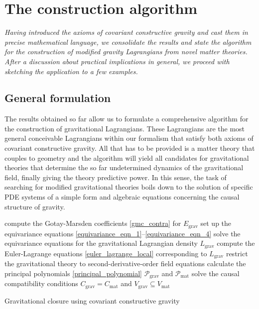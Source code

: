 \chapter{The construction algorithm}
\label{chapter_construction_algorithm}

\textit{Having introduced the axioms of covariant constructive gravity and cast them in precise mathematical language, we consolidate the results and state the algorithm for the construction of modified gravity Lagrangians from novel matter theories. After a discussion about practical implications in general, we proceed with sketching the application to a few examples.}

\section{General formulation}

The results obtained so far allow us to formulate a comprehensive algorithm for the construction of gravitational Lagrangians. These Lagrangians are the most general conceivable Lagrangians within our formalism that satisfy both axioms of covariant constructive gravity. All that has to be provided is a matter theory that couples to geometry and the algorithm will yield all candidates for gravitational theories that determine the so far undetermined dynamics of the gravitational field, finally giving the theory predictive power. In this sense, the task of searching for modified gravitational theories boils down to the solution of specific PDE systems of a simple form and algebraic equations concerning the causal structure of gravity.

\begin{algorithm}[H]\label{algorithm}
  \DontPrintSemicolon
  compute the Gotay-Marsden coefficients \eqref{gmc_contra} for $E_\text{grav}$ \;
  set up the equivariance equations \eqref{equivariance_eqn_1}--\eqref{equivariance_eqn_4} \;
  solve the equivariance equations for the gravitational Lagrangian density $L_\text{grav}$ \;
  compute the Euler-Lagrange equations \eqref{euler_lagrange_local} corresponding to $L_\text{grav}$ \;
  restrict the gravitational theory to second-derivative-order field equations \;
  calculate the principal polynomials \eqref{principal_polynomial} $\mathcal P_\text{grav}$ and $\mathcal P_\text{mat}$ \;
  solve the causal compatibility conditions $C_\text{grav} = C_\text{mat}$ and $V_\text{grav} \subseteq V_\text{mat}$
  \caption{Gravitational closure using covariant constructive gravity}
\end{algorithm}

